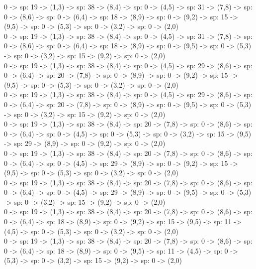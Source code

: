\documentclass[10pt,a4paper]{article}
\begin{document}
0 -> sp: 19 -> (1,3) -> sp: 38 -> (8,4) -> sp: 0 -> (4,5) -> sp: 31 -> (7,8) -> sp: 0 -> (8,6) -> sp: 0 -> (6,4) -> sp: 18 -> (8,9) -> sp: 0 -> (9,2) -> sp: 15 -> (9,5) -> sp: 0 -> (5,3) -> sp: 0 -> (3,2) -> sp: 0 -> (2,0)\\

0 -> sp: 19 -> (1,3) -> sp: 38 -> (8,4) -> sp: 0 -> (4,5) -> sp: 31 -> (7,8) -> sp: 0 -> (8,6) -> sp: 0 -> (6,4) -> sp: 18 -> (8,9) -> sp: 0 -> (9,5) -> sp: 0 -> (5,3) -> sp: 0 -> (3,2) -> sp: 15 -> (9,2) -> sp: 0 -> (2,0)\\

0 -> sp: 19 -> (1,3) -> sp: 38 -> (8,4) -> sp: 0 -> (4,5) -> sp: 29 -> (8,6) -> sp: 0 -> (6,4) -> sp: 20 -> (7,8) -> sp: 0 -> (8,9) -> sp: 0 -> (9,2) -> sp: 15 -> (9,5) -> sp: 0 -> (5,3) -> sp: 0 -> (3,2) -> sp: 0 -> (2,0)\\

0 -> sp: 19 -> (1,3) -> sp: 38 -> (8,4) -> sp: 0 -> (4,5) -> sp: 29 -> (8,6) -> sp: 0 -> (6,4) -> sp: 20 -> (7,8) -> sp: 0 -> (8,9) -> sp: 0 -> (9,5) -> sp: 0 -> (5,3) -> sp: 0 -> (3,2) -> sp: 15 -> (9,2) -> sp: 0 -> (2,0)\\

0 -> sp: 19 -> (1,3) -> sp: 38 -> (8,4) -> sp: 20 -> (7,8) -> sp: 0 -> (8,6) -> sp: 0 -> (6,4) -> sp: 0 -> (4,5) -> sp: 0 -> (5,3) -> sp: 0 -> (3,2) -> sp: 15 -> (9,5) -> sp: 29 -> (8,9) -> sp: 0 -> (9,2) -> sp: 0 -> (2,0)\\

0 -> sp: 19 -> (1,3) -> sp: 38 -> (8,4) -> sp: 20 -> (7,8) -> sp: 0 -> (8,6) -> sp: 0 -> (6,4) -> sp: 0 -> (4,5) -> sp: 29 -> (8,9) -> sp: 0 -> (9,2) -> sp: 15 -> (9,5) -> sp: 0 -> (5,3) -> sp: 0 -> (3,2) -> sp: 0 -> (2,0)\\

0 -> sp: 19 -> (1,3) -> sp: 38 -> (8,4) -> sp: 20 -> (7,8) -> sp: 0 -> (8,6) -> sp: 0 -> (6,4) -> sp: 0 -> (4,5) -> sp: 29 -> (8,9) -> sp: 0 -> (9,5) -> sp: 0 -> (5,3) -> sp: 0 -> (3,2) -> sp: 15 -> (9,2) -> sp: 0 -> (2,0)\\

0 -> sp: 19 -> (1,3) -> sp: 38 -> (8,4) -> sp: 20 -> (7,8) -> sp: 0 -> (8,6) -> sp: 0 -> (6,4) -> sp: 18 -> (8,9) -> sp: 0 -> (9,2) -> sp: 15 -> (9,5) -> sp: 11 -> (4,5) -> sp: 0 -> (5,3) -> sp: 0 -> (3,2) -> sp: 0 -> (2,0)\\

0 -> sp: 19 -> (1,3) -> sp: 38 -> (8,4) -> sp: 20 -> (7,8) -> sp: 0 -> (8,6) -> sp: 0 -> (6,4) -> sp: 18 -> (8,9) -> sp: 0 -> (9,5) -> sp: 11 -> (4,5) -> sp: 0 -> (5,3) -> sp: 0 -> (3,2) -> sp: 15 -> (9,2) -> sp: 0 -> (2,0)\\
\end{document}

